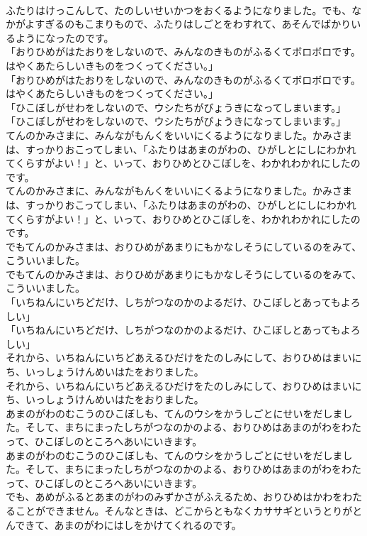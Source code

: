 \documentclass[8pt]{extreport}
\begin{document}
\begin{CJK}{UTF8}{min}
\\	ふたりはけっこんして、たのしいせいかつをおくるようになりました。でも、なかがよすぎるのもこまりもので、ふたりはしごとをわすれて、あそんでばかりいるようになったのです。
\\	「おりひめがはたおりをしないので、みんなのきものがふるくてボロボロです。はやくあたらしいきものをつくってください。」
\\	「おりひめがはたおりをしないので、みんなのきものがふるくてボロボロです。はやくあたらしいきものをつくってください。」
\\	「ひこぼしがせわをしないので、ウシたちがびょうきになってしまいます。」
\\	「ひこぼしがせわをしないので、ウシたちがびょうきになってしまいます。」
\\	てんのかみさまに、みんながもんくをいいにくるようになりました。かみさまは、すっかりおこってしまい、「ふたりはあまのがわの、ひがしとにしにわかれてくらすがよい！」と、いって、おりひめとひこぼしを、わかれわかれにしたのです。
\\	てんのかみさまに、みんながもんくをいいにくるようになりました。かみさまは、すっかりおこってしまい、「ふたりはあまのがわの、ひがしとにしにわかれてくらすがよい！」と、いって、おりひめとひこぼしを、わかれわかれにしたのです。
\\	でもてんのかみさまは、おりひめがあまりにもかなしそうにしているのをみて、こういいました。
\\	でもてんのかみさまは、おりひめがあまりにもかなしそうにしているのをみて、こういいました。
\\	「いちねんにいちどだけ、しちがつなのかのよるだけ、ひこぼしとあってもよろしい」
\\	「いちねんにいちどだけ、しちがつなのかのよるだけ、ひこぼしとあってもよろしい」
\\	それから、いちねんにいちどあえるひだけをたのしみにして、おりひめはまいにち、いっしょうけんめいはたをおりました。
\\	それから、いちねんにいちどあえるひだけをたのしみにして、おりひめはまいにち、いっしょうけんめいはたをおりました。
\\	あまのがわのむこうのひこぼしも、てんのウシをかうしごとにせいをだしました。そして、まちにまったしちがつなのかのよる、おりひめはあまのがわをわたって、ひこぼしのところへあいにいきます。
\\	あまのがわのむこうのひこぼしも、てんのウシをかうしごとにせいをだしました。そして、まちにまったしちがつなのかのよる、おりひめはあまのがわをわたって、ひこぼしのところへあいにいきます。
\\	でも、あめがふるとあまのがわのみずかさがふえるため、おりひめはかわをわたることができません。そんなときは、どこからともなくカササギというとりがとんできて、あまのがわにはしをかけてくれるのです。

\end{CJK}
\end{document}
